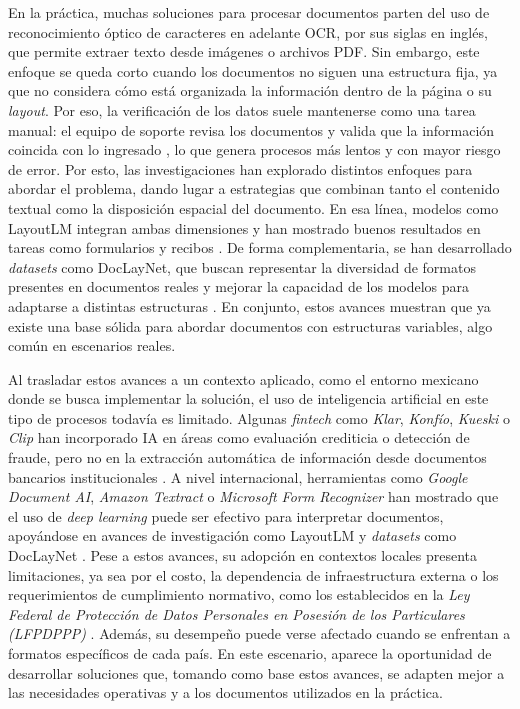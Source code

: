 En la práctica, muchas soluciones para procesar documentos parten del uso de reconocimiento óptico de caracteres en adelante OCR, por sus siglas en inglés, que permite extraer texto desde imágenes o archivos PDF. Sin embargo, este enfoque se queda corto cuando los documentos no siguen una estructura fija, ya que no considera cómo está organizada la información dentro de la página o su \textit{layout}. Por eso, la verificación de los datos suele mantenerse como una tarea manual: el equipo de soporte revisa los documentos y valida que la información coincida con lo ingresado \cite{validacion_clabe}, lo que genera procesos más lentos y con mayor riesgo de error. Por esto, las investigaciones han explorado distintos enfoques para abordar el problema, dando lugar a estrategias que combinan tanto el contenido textual como la disposición espacial del documento. En esa línea, modelos como LayoutLM integran ambas dimensiones y han mostrado buenos resultados en tareas como formularios y recibos \cite{Xu2020LayoutLM}. De forma complementaria, se han desarrollado \textit{datasets} como DocLayNet, que buscan representar la diversidad de formatos presentes en documentos reales y mejorar la capacidad de los modelos para adaptarse a distintas estructuras \cite{Pfitzmann2022DocLayNet}. En conjunto, estos avances muestran que ya existe una base sólida para abordar documentos con estructuras variables, algo común en escenarios reales.

Al trasladar estos avances a un contexto aplicado, como el entorno mexicano donde se busca implementar la solución, el uso de inteligencia artificial en este tipo de procesos todavía es limitado. Algunas \textit{fintech} como \textit{Klar}, \textit{Konfío}, \textit{Kueski} o \textit{Clip} han incorporado IA en áreas como evaluación crediticia o detección de fraude, pero no en la extracción automática de información desde documentos bancarios institucionales \cite{klar,konfio,kueski,clip}. A nivel internacional, herramientas como \textit{Google Document AI}, \textit{Amazon Textract} o \textit{Microsoft Form Recognizer} han mostrado que el uso de \textit{deep learning} puede ser efectivo para interpretar documentos, apoyándose en avances de investigación como LayoutLM \cite{Xu2020LayoutLM} y \textit{datasets} como DocLayNet \cite{Pfitzmann2022DocLayNet}. Pese a estos avances, su adopción en contextos locales presenta limitaciones, ya sea por el costo, la dependencia de infraestructura externa o los requerimientos de cumplimiento normativo, como los establecidos en la \textit{Ley Federal de Protección de Datos Personales en Posesión de los Particulares (LFPDPPP)} \cite{lfpdppp}. Además, su desempeño puede verse afectado cuando se enfrentan a formatos específicos de cada país. En este escenario, aparece la oportunidad de desarrollar soluciones que, tomando como base estos avances, se adapten mejor a las necesidades operativas y a los documentos utilizados en la práctica.


